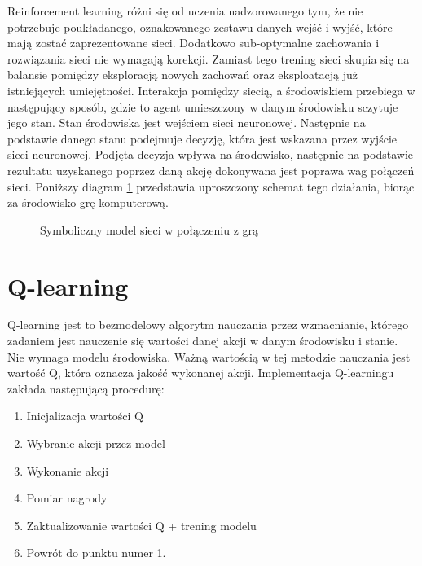 Reinforcement learning różni się od uczenia nadzorowanego tym, że nie potrzebuje poukładanego, oznakowanego zestawu danych wejść i wyjść, które mają zostać zaprezentowane sieci. Dodatkowo sub-optymalne zachowania i rozwiązania sieci nie wymagają korekcji. Zamiast tego trening sieci skupia się na balansie pomiędzy eksploracją nowych zachowań oraz eksploatacją już istniejących umiejętności.
Interakcja pomiędzy siecią, a środowiskiem przebiega w następujący sposób, gdzie to agent umieszczony w danym środowisku sczytuje jego stan. Stan środowiska jest wejściem sieci neuronowej. Następnie na podstawie danego stanu podejmuje decyzję, która jest wskazana przez wyjście sieci neuronowej. Podjęta decyzja wpływa na środowisko, następnie na podstawie rezultatu uzyskanego poprzez daną akcję dokonywana jest poprawa wag połączeń sieci. Poniższy diagram \ref{img:rf_learning_diagram} przedstawia uproszczony schemat tego działania, biorąc za środowisko grę komputerową.

\begin{figure}[h]
    \centering
    \caption{Symboliczny model sieci w połączeniu z grą}
    \label{img:rf_learning_diagram}
\end{figure}


\section{Q-learning}

Q-learning \cite{HandsOnQLearningWithPython} \cite{Qlearning} jest to bezmodelowy algorytm nauczania przez wzmacnianie, którego zadaniem jest nauczenie się wartości danej akcji w danym środowisku i stanie. Nie wymaga modelu środowiska. Ważną wartością w tej metodzie nauczania jest wartość Q, która oznacza jakość wykonanej akcji.
Implementacja Q-learningu zakłada następującą procedurę:

\begin{enumerate}
    \item Inicjalizacja wartości Q
    \item Wybranie akcji przez model
    \item Wykonanie akcji
    \item Pomiar nagrody
    \item Zaktualizowanie wartości Q + trening modelu
    \item Powrót do punktu numer 1.
\end{enumerate}

